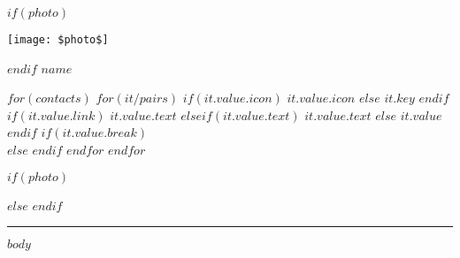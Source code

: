 \documentclass[10pt]{article}
\begin{document}
$if(photo)$
\begin{minipage}{0.2\textwidth}
  \texttt{[image: \$photo\$]}
\end{minipage}
\begin{minipage}{0.8\textwidth}
$endif$
  {%
    \centering\huge{\textbf{\uppercase{$name$}}} \\
    \hfill
  }

  \vspace{-1em}

  \begin{center}
  $for(contacts)$
    $for(it/pairs)$
      $if(it.value.icon)$
        \fa$it.value.icon$
      $else$
        \textbf{$it.key$}
      $endif$
      \hspace{0.3em}
      $if(it.value.link)$
        \href{$it.value.link$}{$it.value.text$}
      $elseif(it.value.text)$
        {$it.value.text$}
      $else$
        {$it.value$}
      $endif$
      $if(it.value.break)$
        \\
      $else$
        \>
      $endif$
    $endfor$
  $endfor$
  \end{center}
$if(photo)$
\end{minipage}
$else$
\vspace{-1em}
$endif$

\textcolor{lightgray}{\rule{\textwidth}{0.05pt}}

\vspace{-.5em}

$body$
\end{document}
